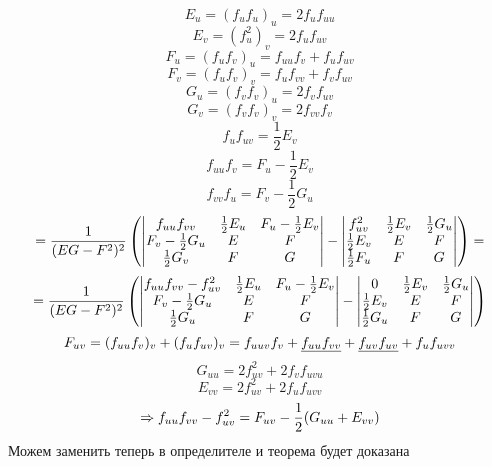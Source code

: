 \documentclass[main]{subfiles}
\begin{document}
\begin{Proof}
      \[E_u = (f_u f_u)_u = 2 f_u f_{uu}\]
      \[E_v = (f_u^2)_v = 2 f_u f_{uv}\]
      \[F_u = (f_u f_v)_u = f_{uu}f_v + f_u f_{uv}\]
      \[F_v = (f_u f_v)_v = f_u f_{vv} + f_v f_{uv}\]
      \[G_u = (f_v f_v)_u = 2 f_v f_{uv}\]
      \[G_v = (f_v f_v)_v = 2 f_{vv} f_v\]
      \[f_u f_{uv} = \frac{1}{2} E_v\]
      \[f_{uu} f_v = F_u - \frac{1}{2} E_v\]
      \[f_{vv} f_u = F_v - \frac{1}{2} G_u\]
      \[ = \frac{1}{(EG - F^2)^2} \left(\begin{vmatrix}
          f_{uu} f_{vv} & \frac{1}{2} E_u & F_u - \frac{1}{2} E_v\\
          F_v - \frac{1}{2} G_u & E & F\\
          \frac{1}{2} G_v & F & G
        \end{vmatrix} - \begin{vmatrix}
            f_{uv}^2 & \frac{1}{2}E_v & \frac{1}{2} G_u\\
            \frac{1}{2}E_v & E & F\\
            \frac{1}{2}F_u & F & G
          \end{vmatrix}\right) =
      \]
      \[ = \frac{1}{(EG - F^2)^2} \left(\begin{vmatrix}
          f_{uu} f_{vv} - f_{uv}^2 & \frac{1}{2} E_u & F_u - \frac{1}{2} E_v\\
          F_v - \frac{1}{2} G_u & E & F\\
          \frac{1}{2} G_u & F & G
        \end{vmatrix} - \begin{vmatrix}
          0 & \frac{1}{2}E_v & \frac{1}{2} G_u\\
          \frac{1}{2}E_v & E & F\\
          \frac{1}{2}G_u & F & G
        \end{vmatrix}\right)
      \]
      \[F_{uv} = (f_{uu} f_v)_v + (f_u f_{uv})_v = f_{uuv} f_v + \underline{f_{uu}f_{vv}} + \underline{f_{uv}f_{uv}} + f_u f_{uvv}\]
      \[G_{uu} = 2 f_{uv}^2 + 2 f_v f_{uvu}\]
      \[E_{vv} = 2 f_{uv}^2 + 2 f_u f_{uvv}\]
      \[\Rightarrow f_{uu} f_{vv} - f^2_{uv} = F_{uv} - \frac{1}{2}(G_{uu}+E_{vv})\]
      Можем заменить теперь в определителе и теорема будет доказана
    \end{Proof}
\end{document}
